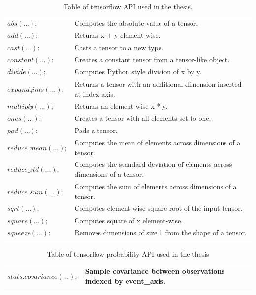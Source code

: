 \documentclass[12pt]{report}
\begin{document}
\begin{longtable}{ p{} | p{}} 
\caption{Table of tensorflow API used in the thesis.}\\
\hline
$abs(...);$ & Computes the absolute value of a tensor. \\

$add(...);$ & Returns x + y element-wise. \\ 

$cast(...):$ & Casts a tensor to a new type.\\

$constant(...):$ & Creates a constant tensor from a tensor-like object. \\

$divide(...);$ & Computes Python style division of x by y. \\ 

$expand_dims(...):$ & Returns a tensor with an additional dimension inserted at index axis. \\

$multiply(...);$ & Returns an element-wise x * y. \\ 

$ones(...):$ & Creates a tensor with all elements set to one. \\

$pad(...):$ & Pads a tensor. \\

$reduce\_mean(...);$ & Computes the mean of elements across dimensions of a tensor. \\ 

$reduce\_std(...);$ & Computes the standard deviation of elements across dimensions of a tensor. \\ 

$reduce\_sum(...);$ & Computes the sum of elements across dimensions of a tensor. \\ 

$sqrt(...);$ & Computes element-wise square root of the input tensor. \\ 

$square(...);$ & Computes square of x element-wise. \\ 

$squeeze(...):$ & Removes dimensions of size 1 from the shape of a tensor.\\
\hline
\label{tab:tensorflowapi}
\end{longtable}

\begin{longtable}{ p{} | p{}} 
\caption{Table of tensorflow probability API used in the thesis}\\
\hline
$stats.covariance(...);$ & Sample covariance between observations indexed by event\_axis. \\ 
\hline
\label{tab:tensorflowprobability}
\end{longtable}
\end{document}
